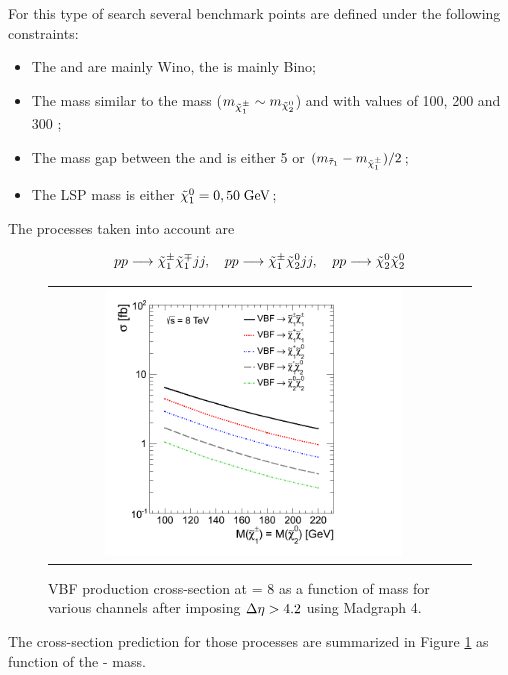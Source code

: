 For this type of search several benchmark points are defined under the following constraints:
\begin{itemize}
	\item The \charginopm and \neutralinotwo are mainly Wino, the \neutralinoone is mainly Bino;
	\item The \charginomp mass similar to the \neutralinotwo mass ($m_{\tilde{\chi}^{\pm}_{1}} \sim m_{\tilde{\chi}^{0}_{2}}$) and with values of 100, 200 and 300 \gev;
	\item The mass gap between the \stau and \charginopm is either 5 \gev or $(m_{\tilde{\tau}_{1}} - m_{\tilde{\chi}^{\pm}_{1}})/2$;
	\item The LSP mass is either $\tilde{\chi}^{0}_{1} = 0 , 50 \;\text{Ge}\kern-0.06667em\text{V}$;
\end{itemize}

The processes taken into account are

\begin{equation}
pp \longrightarrow \tilde{\chi}^{\pm}_{1} \tilde{\chi}^{\mp}_{1} jj, \quad pp \longrightarrow \tilde{\chi}^{\pm}_{1} \tilde{\chi}^{0}_{2} jj, \quad pp \longrightarrow \tilde{\chi}^{0}_{2} \tilde{\chi}^{0}_{2}
\end{equation}

\begin{figure}[tbh!]
	\centering
	\begin{tabular}{cc}
		\includegraphics[width=0.75\textwidth]{analysis/pics/VBFXsection.png}
	\end{tabular}
	\caption{VBF production cross-section at \CM = 8 \tev as a function of mass for various channels after imposing \ensuremath{\deltaeta > 4.2} using Madgraph 4.}
	\label{fig:VBF_xsec}
\end{figure}

The cross-section prediction for those processes are summarized in Figure \ref{fig:VBF_xsec} as function of the \charginomp - \neutralinotwo mass.

